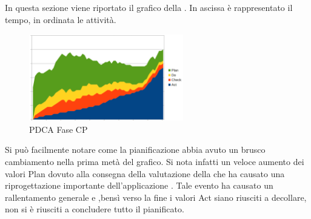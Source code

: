 In questa sezione viene riportato il grafico  della . In ascissa è rappresentato il tempo, in ordinata le attività.

\begin{figure}[H]
	\centering
	\includegraphics[width=0.6\textwidth]{PianoDiQualifica/Pics/GraficoPDCAFaseCP.png}
	\caption{PDCA Fase CP}
\end{figure}
Si può facilmente notare come la pianificazione abbia avuto un brusco cambiamento nella prima metà del grafico. Si nota infatti un veloce aumento dei valori Plan dovuto alla consegna della valutazione della  che ha causato una riprogettazione importante dell'applicazione . Tale evento ha causato un rallentamento generale e ,bensì verso la fine i valori Act siano riusciti a decollare, non si è riusciti a concludere tutto il pianificato.